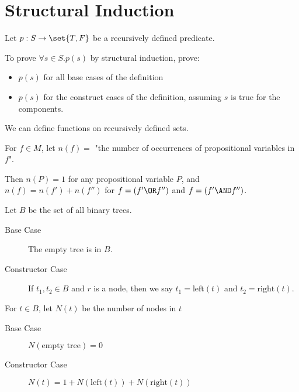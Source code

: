 \documentclass[11pt]{scrartcl}
\begin{document}
\section{Structural Induction}

Let $p:S\to \set{T, F}$ be a recursively defined predicate.

To prove $\forall s \in S. p(s)$ by structural induction, prove:

\begin{itemize}
\item $p(s)$ for all base cases of the definition
\item $p(s)$ for the construct cases of the definition, assuming $s$ is true for the components.
\end{itemize}

We can define functions on recursively defined sets.
\begin{example}


For $f\in M$, let $n(f)=$ "the number of occurrences of propositional variables in $f$".

Then $n(P) = 1$ for any propositional variable $P$, and $n(f) = n(f') + n(f'')$ for $f = (f' \OR f'')$ and $f = (f'\AND f'')$.

Let $B$ be the set of all binary trees.
\begin{description}
\item[Base Case] \hfill

  The empty tree is in $B$.  
\item[Constructor Case] \hfill
  
  If $t_1, t_2 \in B$ and $r$ is a node, then we say $t_1 = \text{left}(t)$ and $t_2=\text{right}(t)$.
\end{description}


\end{example}

\begin{example}

  For $t\in B$, let $N(t)$ be the number of nodes in $t$

  \begin{description}
  \item[Base Case] \hfill

    $N(\text{empty tree}) =0$
  \item[Constructor Case] \hfill

    $N(t) = 1 + N(\text{left}(t)) + N(\text{right}(t))$

  \end{description}

\end{example}
\end{document}
